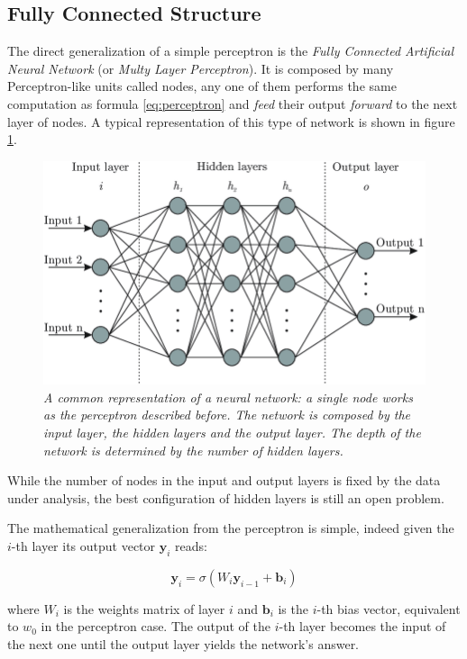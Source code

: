 \documentclass[12pt,a4paper]{report}
\begin{document}
\subsection*{Fully Connected Structure}

The direct generalization of a simple perceptron is the \textit{Fully Connected Artificial Neural Network} (or {\it Multy Layer Perceptron}). 
It is composed by many Perceptron-like units called nodes, any one of them performs the same computation as formula \ref{eq:perceptron} and \textit{feed} their output \textit{forward} to the next layer of nodes. 
A typical representation of this type of network is shown in figure \ref{fig:ann}.

\begin{figure}[h]
 \centering
 \includegraphics[scale=0.35]{./images/neural_net.png}
 \caption{{\it A common representation of a neural network: a single node works as the perceptron described before. The network is composed by the input layer, the hidden layers and the output layer. The depth of the network is determined by the number of hidden layers.}}
 \label{fig:ann}
\end{figure}

While the number of nodes in the input and output layers is fixed by the data under analysis, the best configuration of hidden layers is still an open problem.

The mathematical generalization from the perceptron is simple, indeed given the $i$-th layer its output vector $\bm{y}_i$ reads:  

\begin{equation}
 \bm{y}_i = \sigma(W_i \bm{y}_{i-1} + \bm{b}_i)
\end{equation}

where $W_i$ is the weights matrix of layer $i$ and $\bm{b}_i$ is the $i$-th bias vector, equivalent to $w_0$ in the perceptron case.
The output of the $i$-th layer becomes the input of the next one until the output layer yields the network's answer. 
\end{document}
